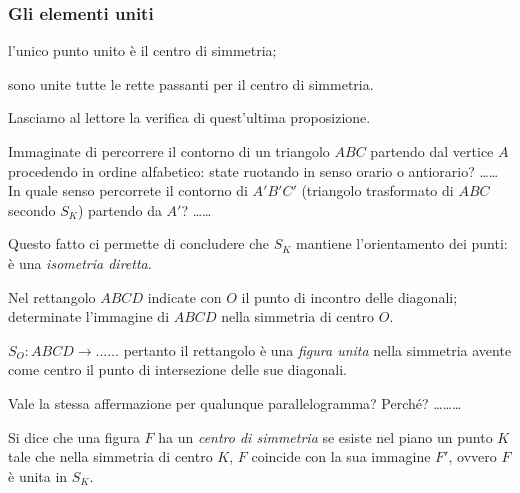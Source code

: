 \subsubsection{Gli elementi uniti}

\begin{itemize*}
\item l'unico punto unito è il centro di simmetria;
\item sono unite tutte le rette passanti per il centro di simmetria.
\end{itemize*}
Lasciamo al lettore la verifica di quest'ultima 
proposizione.\vspace{8pt}

Immaginate di percorrere il contorno di un triangolo $ABC$ partendo 
dal vertice $A$ procedendo in ordine alfabetico: state ruotando in 
senso orario o antiorario? \ldots\ldots{} In quale senso percorrete 
il contorno di $A'B'C'$ (triangolo trasformato di $ABC$ secondo 
$S_K$) partendo da $A'$? \ldots\ldots{}

Questo fatto ci permette di concludere che $S_K$ mantiene 
l'orientamento dei punti: è una \emph{isometria diretta}.

\begin{esempio}
Nel rettangolo $ABCD$ indicate con $O$ il punto di incontro delle 
diagonali; determinate l'immagine di $ABCD$ nella simmetria di centro 
$O$.

$S_O:ABCD \rightarrow \ldots\ldots{}$ pertanto il rettangolo è una 
\emph{figura unita} nella simmetria avente come centro il punto di 
intersezione delle sue diagonali.

\begin{figure*}[!htb]
    \centering
\end{figure*}

Vale la stessa affermazione per qualunque parallelogramma? Perché? 
\ldots\ldots\ldots{}

\begin{figure*}[!htb]
    \centering
\end{figure*}

\end{esempio}

\begin{definizione}
Si dice che una figura $F$ ha un \emph{centro di simmetria} se esiste 
nel piano un punto $K$ tale che nella simmetria di centro $K$, $F$ 
coincide con la sua immagine $F'$, ovvero $F$ è unita in $S_K$. 
\end{definizione}

